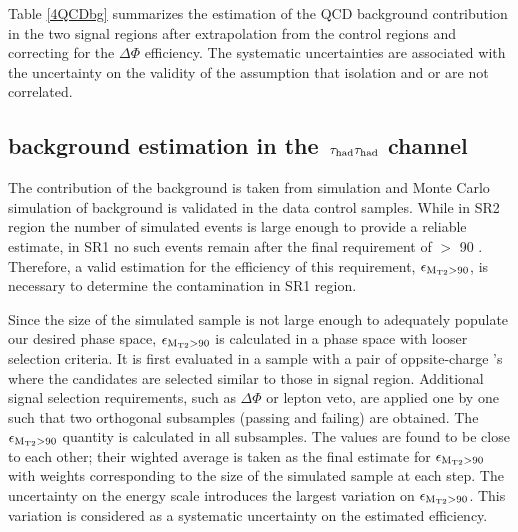 Table \ref{4QCDbg} 
summarizes the estimation of the QCD background contribution in the two signal regions after extrapolation from the control regions and 
correcting for the $\Delta \Phi$ efficiency.  
The systematic uncertainties are associated with the uncertainty on the validity 
of the assumption that isolation and \mttwo or \SumMT are not correlated.


\subsection{\texorpdfstring{\wjets background estimation in the $\,\tau_{\rm had}\tau_{\rm had}$ channel}{Wjets background estimation in the tau-tau channel}}
The contribution of the \wjets background is taken from simulation and Monte Carlo simulation of \wjets  background 
is validated in the data control samples. 
While in SR2 region the number of simulated \wjets events is large enough to provide a reliable estimate, in SR1 no such events remain after the final requirement of \mttwo $>$ 90 \GeV. Therefore, a valid estimation for the efficiency of this requirement, $\epsilon_{\rm M_{T2}>90}$, is necessary to determine the \wjets contamination in SR1 region.

Since the size of the simulated \wjets sample is not large enough to adequately populate our desired phase space, $\epsilon_{\rm M_{T2}>90}$ is calculated in a phase space with looser selection criteria. It is first evaluated in a \wjets sample with a pair of oppsite-charge \Tau's where the \Tau candidates are selected similar to those in signal region. Additional signal selection requirements, such as $\Delta \Phi$ or lepton veto, are applied one by one such that two orthogonal subsamples (passing and failing) are obtained. The $\epsilon_{\rm M_{T2}>90}$ quantity is calculated in all subsamples. The values are found to be close to each other; their wighted average is taken as the final estimate for $\epsilon_{\rm M_{T2}>90}$ with weights corresponding to the size of the simulated sample at each step. The uncertainty on the \Tau energy scale introduces the largest variation on $\epsilon_{\rm M_{T2}>90}$. This variation is considered as a systematic uncertainty on the estimated efficiency.

